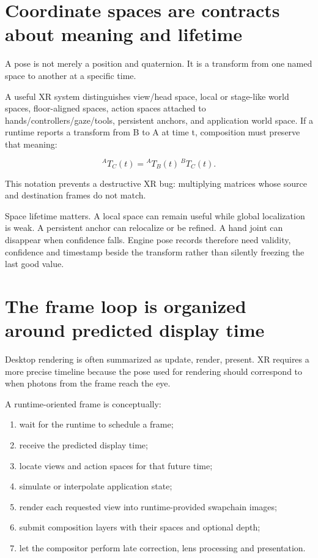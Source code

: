 \section{Coordinate spaces are contracts about meaning and lifetime}\label{04-visual-computing-ii-ch035-coordinate-spaces-are-contracts-about-meaning-and-lifetime}

A pose is not merely a position and quaternion. It is a transform from one named space to another at a specific time.

A useful XR system distinguishes view/head space, local or stage-like world spaces, floor-aligned spaces, action spaces attached to hands/controllers/gaze/tools, persistent anchors, and application world space. If a runtime reports a transform from B to A at time t, composition must preserve that meaning:

\[
{}^AT_C(t) = {}^AT_B(t)\,{}^BT_C(t).
\]

This notation prevents a destructive XR bug: multiplying matrices whose source and destination frames do not match.

Space lifetime matters. A local space can remain useful while global localization is weak. A persistent anchor can relocalize or be refined. A hand joint can disappear when confidence falls. Engine pose records therefore need validity, confidence and timestamp beside the transform rather than silently freezing the last good value.

\section{The frame loop is organized around predicted display time}\label{04-visual-computing-ii-ch035-the-frame-loop-is-organized-around-predicted-display-time}

Desktop rendering is often summarized as update, render, present. XR requires a more precise timeline because the pose used for rendering should correspond to when photons from the frame reach the eye.

A runtime-oriented frame is conceptually:

\begin{enumerate}
\def\labelenumi{\arabic{enumi}.}
\tightlist
\item
  wait for the runtime to schedule a frame;
\item
  receive the predicted display time;
\item
  locate views and action spaces for that future time;
\item
  simulate or interpolate application state;
\item
  render each requested view into runtime-provided swapchain images;
\item
  submit composition layers with their spaces and optional depth;
\item
  let the compositor perform late correction, lens processing and presentation.
\end{enumerate}

